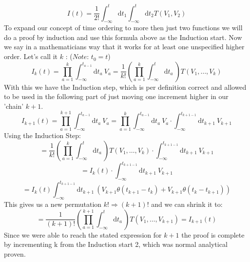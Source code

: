 \documentclass[12pt, titlepage]{article}
\begin{document}
\begin{equation}
I(t)=\dfrac{1}{2!}
\int_{-\infty}^{t}\mathrm{d}t_1\int_{-\infty}^{t}\! \! \mathrm{d}t_2
T(V_1,V_2)
\end{equation}
To expand our concept of time ordering to more then just two functions we will do a proof by induction and use this formula above as the Induction start.
Now we say in a mathematicians way that it works for at least one unspecified higher order. Let's call it $ k $ : ($ \textit{Note:} $ $ t_0 = t $)\\
\begin{equation}
I_k (t)
=
 \prod_{a=1}^{k} 
 \int_{-\infty}^{t_{a-1}}\mathrm{d}t_a\
  V_a
=
\dfrac{1}{k!}
 (
 \prod_{a=1}^{k} 
\int_{-\infty}^{t}\mathrm{d}t_a\
)
T(V_1,\ldots,V_k)
\end{equation}
With this we have the Induction step, which is per definition correct and allowed to be used in the following part of just moving one increment higher in our 'chain' $ k+1 $.
\\
\begin{equation}
I_{k+1} (t)
=
 \prod_{a=1}^{k+1} 
 \int_{-\infty}^{t_{a-1}}\mathrm{d}t_a\
  V_a
  =
   \prod_{a=1}^{k} 
 \int_{-\infty}^{t_{a-1}}\mathrm{d}t_a\
  V_a
  \cdot
 \int_{-\infty}^{t_{k+1-1}}\mathrm{d}t_{k+1}\
 V_{k+1}
\end{equation}
Using the Induction Step:
\\
\begin{equation}
=
\dfrac{1}{k!}
 (
 \prod_{a=1}^{k} 
\int_{-\infty}^{t}\mathrm{d}t_a\
)
T(V_1,\ldots,V_k)
\cdot
 \int_{-\infty}^{t_{k+1-1}}\mathrm{d}t_{k+1}\
 V_{k+1}
\end{equation}
\begin{equation}
=
I_k (t)
\cdot
 \int_{-\infty}^{t_{k+1-1}}\mathrm{d}t_{k+1}\
 V_{k+1}
\end{equation}
\begin{equation} 
 =
 I_k (t)
  \int_{-\infty}^{t_{k+1-1}}\mathrm{d}t_{k+1}\
 (
 V_{k+1}
 \theta (t_{k+1} -t_{k})
 +
 V_{k+1}
 \theta (t_{k} -t_{k+1})
)\end{equation}
This gives us a new permutation $ k! \Rightarrow (k+1)! $ and we can shrink it to:\\
\begin{equation}
=
\dfrac{1}{(k+1)!}
 (
 \prod_{a=1}^{k+1} 
\int_{-\infty}^{t}\mathrm{d}t_a\
)
T(V_1,\ldots,V_{k+1})
=I_{k+1}(t)
\end{equation}
Since we were able to reach the stated expression for $ k+1 $ the proof is complete by incrementing k from the Induction start 2, which was normal analytical proven.
\end{document}
